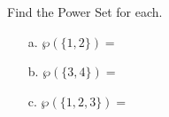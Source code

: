 \documentclass[a4paper,12pt]{book}
\newcounter{question}
\begin{document}
        \begin{questionNOGRADE}{\thequestion}

            Find the Power Set for each.

            \begin{enumerate}
                \item[a.]   $\wp( \{1, 2\} ) = $
                \item[b.]   $\wp( \{3, 4\} ) = $
                \item[c.]   $\wp( \{1, 2, 3\} ) = $
            \end{enumerate}

        \end{questionNOGRADE}
\end{document}
